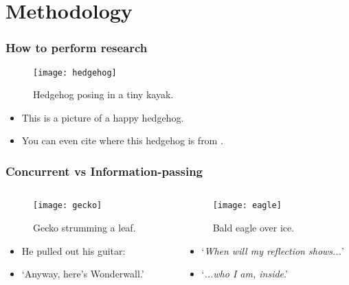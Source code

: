 \documentclass[10pt,xcolor=table]{beamer}
\begin{document}
\section{Methodology}
\begin{frame}
  \frametitle{How to perform research}
  \begin{figure}
    \texttt{[image: hedgehog]}
    \caption{Hedgehog posing in a tiny kayak.}
  \end{figure}
  \vspace{-0.4cm}
  \begin{itemize}
  \item This is a picture of a happy hedgehog.
  \item You can even cite where this hedgehog is from .
  \end{itemize}
  \vspace{0.15cm}
\end{frame}

\begin{frame}
  \frametitle{Concurrent vs Information-passing}
  \begin{columns}
    \begin{column}{0.5\textwidth}
      \begin{figure}
        \texttt{[image: gecko]}
        \caption{Gecko strumming a leaf\footnotemark[2].}
      \end{figure}
      \begin{itemize}
      \item He pulled out his guitar:
      \item `Anyway, here's Wonderwall.'
      \end{itemize}
    \end{column}
    \begin{column}{0.5\textwidth}
      \begin{figure}
        \texttt{[image: eagle]}
        \caption{Bald eagle over ice\footnotemark[3].}
      \end{figure}
      \begin{itemize}
      \item `\textit{When will my reflection shows...}'
      \item `\textit{...who I am, inside}.'
      \end{itemize}      
    \end{column}    
  \end{columns}
  \vspace{0.25cm}
\end{frame}
\end{document}
